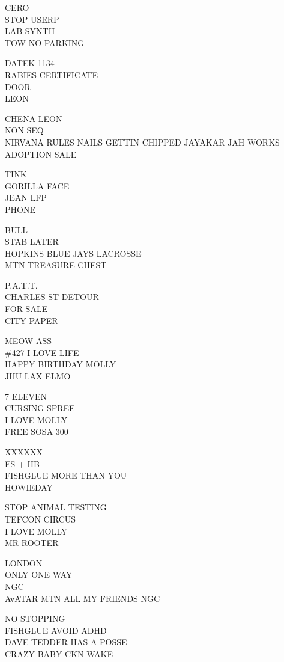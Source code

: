 \documentclass[10pt,letterpaper]{article}
\begin{document}
CERO\\
STOP USERP\\
LAB SYNTH\\
TOW NO PARKING

DATEK 1134\\
RABIES CERTIFICATE\\
DOOR\\
LEON

CHENA LEON\\
NON SEQ\\
NIRVANA RULES NAILS GETTIN CHIPPED JAYAKAR JAH WORKS\\
ADOPTION SALE

TINK\\
GORILLA FACE\\
JEAN LFP\\
PHONE

BULL\\
STAB LATER\\
HOPKINS BLUE JAYS LACROSSE\\
MTN TREASURE CHEST

P.A.T.T.\\
CHARLES ST DETOUR\\
FOR SALE\\
CITY PAPER

MEOW ASS\\
\#427 I LOVE LIFE\\
HAPPY BIRTHDAY MOLLY\\
JHU LAX ELMO

7 ELEVEN\\
CURSING SPREE\\
I LOVE MOLLY\\
FREE SOSA 300

XXXXXX\\
ES  + HB\\
FISHGLUE MORE THAN YOU\\
HOWIEDAY

STOP ANIMAL TESTING\\
TEFCON CIRCUS\\
I LOVE MOLLY\\
MR ROOTER

LONDON\\
ONLY ONE WAY\\
NGC\\
AvATAR MTN ALL MY FRIENDS NGC

NO STOPPING\\
FISHGLUE AVOID ADHD\\
DAVE TEDDER HAS A POSSE\\
CRAZY BABY CKN WAKE
\end{document}
